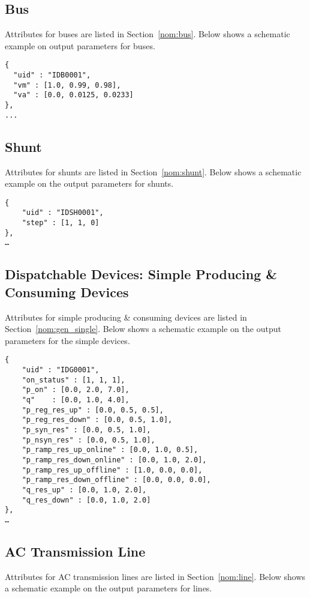 \label{sec:output_bus}
\subsection{Bus}
Attributes for buses are listed in Section~\ref{nom:bus}.
Below shows a schematic example on output parameters for buses.
\begin{verbatim}
{
  "uid" : "IDB0001",
  "vm" : [1.0, 0.99, 0.98],
  "va" : [0.0, 0.0125, 0.0233]
},
...
\end{verbatim}
    
\label{sec:output_shunt}
\subsection{Shunt}
Attributes for shunts are listed in Section~\ref{nom:shunt}.
Below shows a schematic example on the output parameters for shunts.
\begin{verbatim}
{
    "uid" : "IDSH0001",
    "step" : [1, 1, 0]
},
…    
\end{verbatim}

\label{sec:output_generators}
\subsection{Dispatchable Devices: Simple Producing \& Consuming Devices}
Attributes for simple producing \& consuming devices are listed in Section~\ref{nom:gen_single}.
Below shows a schematic example on the output parameters for the simple devices.

\begin{verbatim}
{
    "uid" : "IDG0001",
    "on_status" : [1, 1, 1],
    "p_on" : [0.0, 2.0, 7.0],
    "q"    : [0.0, 1.0, 4.0],
    "p_reg_res_up" : [0.0, 0.5, 0.5],
    "p_reg_res_down" : [0.0, 0.5, 1.0],
    "p_syn_res" : [0.0, 0.5, 1.0],
    "p_nsyn_res" : [0.0, 0.5, 1.0],
    "p_ramp_res_up_online" : [0.0, 1.0, 0.5],
    "p_ramp_res_down_online" : [0.0, 1.0, 2.0],
    "p_ramp_res_up_offline" : [1.0, 0.0, 0.0],
    "p_ramp_res_down_offline" : [0.0, 0.0, 0.0],
    "q_res_up" : [0.0, 1.0, 2.0],
    "q_res_down" : [0.0, 1.0, 2.0]
},
…     
\end{verbatim}

\label{sec:output_acline}
\subsection{AC Transmission Line}
Attributes for AC transmission lines are listed in Section~\ref{nom:line}.
Below shows a schematic example on the output parameters for lines.

